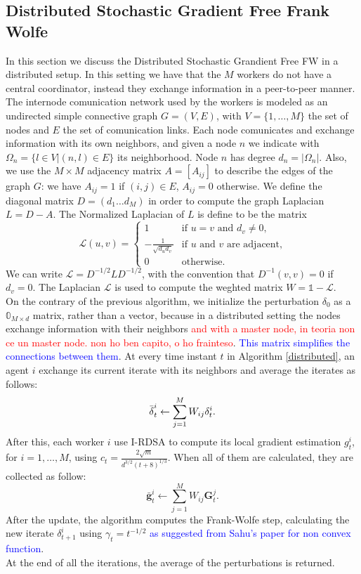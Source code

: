 \subsection{Distributed Stochastic Gradient Free Frank Wolfe}
In this section we discuss the Distributed Stochastic Grandient Free FW in a distributed setup. In this setting we have that the $M$ workers do not have a central coordinator, instead they exchange information in a peer-to-peer manner. The internode comunication network used by the workers is modeled as an undirected simple connective graph $G=(V,E)$, with $V=\{1, \dots, M\}$ the set of nodes and $E$ the set of comunication links. Each node comunicates and exchange information with its own neighbors, and given a node $n$ we indicate with $\Omega_n = \{l \in V | (n,l)\in E\}$ its neighborhood. Node $n$ has degree $d_n = |\Omega_n|$. Also, we use the $M \times M$ adjacency matrix $A=[A_{ij}]$ to describe the edges of the graph $G$: we have $A_{ij}=1$ if $(i,j) \in E$, $A_{ij}=0$ otherwise. We define the diagonal matrix $D=(d_1 \dots d_M)$ in order to compute the graph Laplacian $L=D-A$. The Normalized Laplacian of $L$ is define to be the matrix
\[
\mathcal{L}(u,v)=
\begin{cases}
	1 & \text{if $u=v$ and }d_v\ne0, \\
	-\frac{1}{\sqrt{d_ud_v}} & \text{if $u$ and $v$ are adjacent,}\\
	0 & \text{otherwise.}
	
\end{cases}
\]
We can write $\mathcal{L} = D^{-1/2}LD^{-1/2}$, with the convention that $D^{-1}(v,v) = 0$ if $d_v=0$. The Laplacian $\mathcal{L}$ is used to compute the weghted matrix $W = \mathbb{1}- \mathcal{L}$.\\
On the contrary of the previous algorithm, we initialize the perturbation \boldmath$\delta_0$ as a $\mathbb{0}_{M \times d}$ matrix, rather than a vector, because in a distributed setting the nodes exchange information with their neighbors \textcolor{red}{and with a master node, in teoria non ce un master node. non ho ben capito, o ho frainteso}. \textcolor{blue}{This matrix simplifies the connections between them}. At every time instant $t$ in Algorithm \ref{distributed}, an agent $i$ exchange its current iterate with its neighbors and average the iterates as follows:
\[\bar{\text{\boldmath}\delta}_t^i \leftarrow \sum_{j=1}^{M} W_{ij}\text{\boldmath}\delta_t^i.\]
After this, each worker $i$ use I-RDSA to compute its local gradient estimation $g_t^i$, for $i= 1, \dots, M$, using $c_t = \frac{2\sqrt{m}}{d^{3/2}(t+8)^{1/3}}$. When all of them are calculated, they are collected as follow:
\[ \bar{\textbf{g}}_t^i \leftarrow \sum_{j=1}^{M} W_{ij}\textbf{G}_t^j.\]
After the update, the algorithm computes the Frank-Wolfe step, calculating the new iterate \boldmath$\delta_{t+1}^i$ using $\gamma_t= t^{-1/2}$ \textcolor{blue}{as suggested from Sahu's paper for non convex function}.\\
At the end of all the iterations, the average of the perturbations is returned.\\

